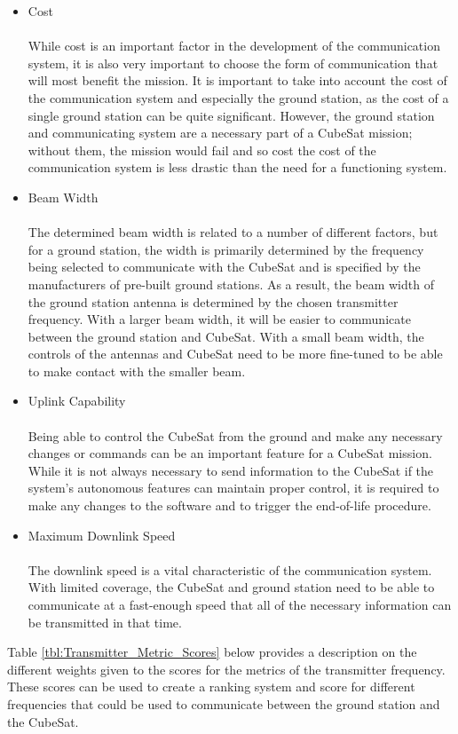 \begin{itemize}
    \item Cost \\
    \\
While cost is an important factor in the development of the communication system, it is also very important to choose the form of communication that will most benefit the mission. It is important to take into account the cost of the communication system and especially the ground station, as the cost of a single ground station can be quite significant. However, the ground station and communicating system are a necessary part of a CubeSat mission; without them, the mission would fail and so cost the cost of the communication system is less drastic than the need for a functioning system. 
    \item Beam Width \\
    \\
The determined beam width is related to a number of different factors, but for a ground station, the width is primarily determined by the frequency being selected to communicate with the CubeSat and is specified by the manufacturers of pre-built ground stations. As a result, the beam width of the ground station antenna is determined by the chosen transmitter frequency. With a larger beam width, it will be easier to communicate between the ground station and CubeSat. With a small beam width, the controls of the antennas and CubeSat need to be more fine-tuned to be able to make contact with the smaller beam.
    \item Uplink Capability \\
    \\
Being able to control the CubeSat from the ground and make any necessary changes or commands can be an important feature for a CubeSat mission. While it is not always necessary to send information to the CubeSat if the system’s autonomous features can maintain proper control, it is required to make any changes to the software and to trigger the end-of-life procedure.
    \item Maximum Downlink Speed \\
    \\
The downlink speed is a vital characteristic of the communication system. With limited coverage, the CubeSat and ground station need to be able to communicate at a fast-enough speed that all of the necessary information can be transmitted in that time.
\end{itemize}

Table \ref{tbl:Transmitter_Metric_Scores} below provides a description on the different weights given to the scores for the metrics of the transmitter frequency. These scores can be used to create a ranking system and score for different frequencies that could be used to communicate between the ground station and the CubeSat. 

